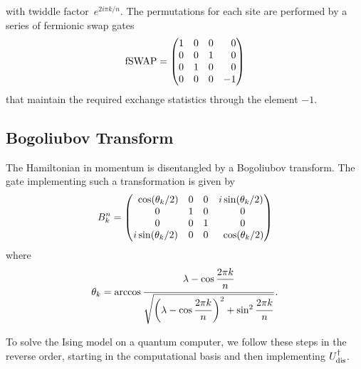 \documentclass[12pt, twocolumn]{article}
\newcommand*{\eu}{e}
\newcommand*{\iu}{i}
\begin{document}
  with twiddle factor~\( \eu^{2 \iu \pi k / n} \). The permutations for each site are performed by a series of fermionic swap gates
  \begin{equation}
    \mathrm{fSWAP}
      = \begin{pmatrix}
          1 & 0 & 0 & \hphantom{-}0 \\
          0 & 0 & 1 & \hphantom{-}0 \\
          0 & 1 & 0 & \hphantom{-}0 \\
          0 & 0 & 0 &           - 1
        \end{pmatrix}
  \end{equation}
  that maintain the required exchange statistics through the element \( -1 \).

  \subsection{Bogoliubov Transform}
  The Hamiltonian in momentum is disentangled by a Bogoliubov transform. The gate implementing such a transformation is given by
  \begin{equation}
    B_{k}^{n}
      = \begin{pmatrix}
          \hphantom{\iu} \cos(\theta_{k} / 2)
                           & 0 & 0 &           \iu  \sin(\theta_{k} / 2) \\
          \hphantom{\iu} 0 & 1 & 0 & \hphantom{\iu} 0 \\
          \hphantom{\iu} 0 & 0 & 1 & \hphantom{\iu} 0 \\
                    \iu  \sin(\theta_{k} / 2)
                           & 0 & 0 & \hphantom{\iu} \cos(\theta_{k} / 2)
      \end{pmatrix}
  \end{equation}
  where
  \begin{equation}
    \theta_{k}
      = \arccos
        \frac{\lambda - \cos \qfrac{2 \pi k}{n}}
             {\sqrt{\biggl( \lambda - \cos \qfrac*{2 \pi k}{n} \biggr)^{2}
              + \sin^{2} \qfrac*{2 \pi k}{n}}}.
  \end{equation}

  To solve the Ising model on a quantum computer, we follow these steps in the reverse order, starting in the computational basis and then implementing \( U_{\textnormal{dis}}^{\dagger} \).
\end{document}
